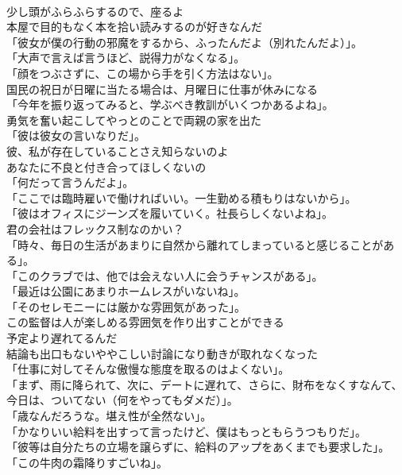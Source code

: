\documentclass[8pt]{extreport}
\begin{document}
\begin{CJK}{UTF8}{min}
\\	少し頭がふらふらするので、座るよ	
\\	本屋で目的もなく本を拾い読みするのが好きなんだ	
\\	「彼女が僕の行動の邪魔をするから、ふったんだよ（別れたんだよ）」。	
\\	「大声で言えば言うほど、説得力がなくなる」。	
\\	「顔をつぶさずに、この場から手を引く方法はない」。	
\\	国民の祝日が日曜に当たる場合は、月曜日に仕事が休みになる	
\\	「今年を振り返ってみると、学ぶべき教訓がいくつかあるよね」。	
\\	勇気を奮い起こしてやっとのことで両親の家を出た	
\\	「彼は彼女の言いなりだ」。	
\\	彼、私が存在していることさえ知らないのよ	
\\	あなたに不良と付き合ってほしくないの	
\\	「何だって言うんだよ」。	
\\	「ここでは臨時雇いで働ければいい。一生勤める積もりはないから」。	
\\	「彼はオフィスにジーンズを履いていく。社長らしくないよね」。	
\\	君の会社はフレックス制なのかい？	
\\	「時々、毎日の生活があまりに自然から離れてしまっていると感じることがある」。	
\\	「このクラブでは、他では会えない人に会うチャンスがある」。	
\\	「最近は公園にあまりホームレスがいないね」。	
\\	「そのセレモニーには厳かな雰囲気があった」。	
\\	この監督は人が楽しめる雰囲気を作り出すことができる	
\\	予定より遅れてるんだ	
\\	結論も出口もないややこしい討論になり動きが取れなくなった	
\\	「仕事に対してそんな傲慢な態度を取るのはよくない」。	
\\	「まず、雨に降られて、次に、デートに遅れて、さらに、財布をなくすなんて、今日は、ついてない（何をやってもダメだ）」。	
\\	「歳なんだろうな。堪え性が全然ない」。	
\\	「かなりいい給料を出すって言ったけど、僕はもっともらうつもりだ」。	
\\	「彼等は自分たちの立場を譲らずに、給料のアップをあくまでも要求した」。	
\\	「この牛肉の霜降りすごいね」。	

\end{CJK}
\end{document}
